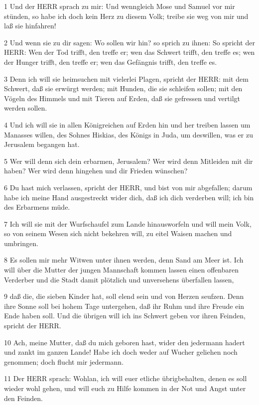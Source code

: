 \par 1 Und der HERR sprach zu mir: Und wenngleich Mose und Samuel vor mir stünden, so habe ich doch kein Herz zu diesem Volk; treibe sie weg von mir und laß sie hinfahren!
\par 2 Und wenn sie zu dir sagen: Wo sollen wir hin? so sprich zu ihnen: So spricht der HERR: Wen der Tod trifft, den treffe er; wen das Schwert trifft, den treffe es; wen der Hunger trifft, den treffe er; wen das Gefängnis trifft, den treffe es.
\par 3 Denn ich will sie heimsuchen mit vielerlei Plagen, spricht der HERR: mit dem Schwert, daß sie erwürgt werden; mit Hunden, die sie schleifen sollen; mit den Vögeln des Himmels und mit Tieren auf Erden, daß sie gefressen und vertilgt werden sollen.
\par 4 Und ich will sie in allen Königreichen auf Erden hin und her treiben lassen um Manasses willen, des Sohnes Hiskias, des Königs in Juda, um deswillen, was er zu Jerusalem begangen hat.
\par 5 Wer will denn sich dein erbarmen, Jerusalem? Wer wird denn Mitleiden mit dir haben? Wer wird denn hingehen und dir Frieden wünschen?
\par 6 Du hast mich verlassen, spricht der HERR, und bist von mir abgefallen; darum habe ich meine Hand ausgestreckt wider dich, daß ich dich verderben will; ich bin des Erbarmens müde.
\par 7 Ich will sie mit der Wurfschaufel zum Lande hinausworfeln und will mein Volk, so von seinem Wesen sich nicht bekehren will, zu eitel Waisen machen und umbringen.
\par 8 Es sollen mir mehr Witwen unter ihnen werden, denn Sand am Meer ist. Ich will über die Mutter der jungen Mannschaft kommen lassen einen offenbaren Verderber und die Stadt damit plötzlich und unversehens überfallen lassen,
\par 9 daß die, die sieben Kinder hat, soll elend sein und von Herzen seufzen. Denn ihre Sonne soll bei hohem Tage untergehen, daß ihr Ruhm und ihre Freude ein Ende haben soll. Und die übrigen will ich ins Schwert geben vor ihren Feinden, spricht der HERR.
\par 10 Ach, meine Mutter, daß du mich geboren hast, wider den jedermann hadert und zankt im ganzen Lande! Habe ich doch weder auf Wucher geliehen noch genommen; doch flucht mir jedermann.
\par 11 Der HERR sprach: Wohlan, ich will euer etliche übrigbehalten, denen es soll wieder wohl gehen, und will euch zu Hilfe kommen in der Not und Angst unter den Feinden.
